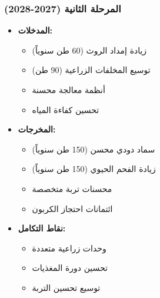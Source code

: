 \subsubsection{المرحلة الثانية (2027-2028)}
\begin{itemize}
    \item \textbf{المدخلات:}
    \begin{itemize}
        \item زيادة إمداد الروث (60 طن سنوياً)
        \item توسيع المخلفات الزراعية (90 طن)
        \item أنظمة معالجة محسنة
        \item تحسين كفاءة المياه
    \end{itemize}
    \item \textbf{المخرجات:}
    \begin{itemize}
        \item سماد دودي محسن (150 طن سنوياً)
        \item زيادة الفحم الحيوي (150 طن سنوياً)
        \item محسنات تربة متخصصة
        \item ائتمانات احتجاز الكربون
    \end{itemize}
    \item \textbf{نقاط التكامل:}
    \begin{itemize}
        \item وحدات زراعية متعددة
        \item تحسين دورة المغذيات
        \item توسيع تحسين التربة
    \end{itemize}
\end{itemize}

